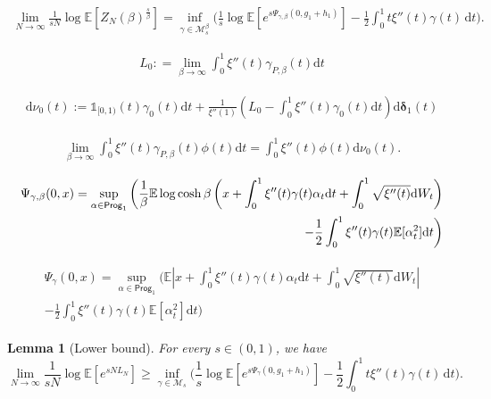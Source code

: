 \documentclass[10pt,a4paper]{amsart}
\newtheorem{lemma}{Lemma}
\newcommand{\E}{\mathbb{E}}
\newcommand{\Ll}{\left}
\newcommand{\Rr}{\right}
\newcommand{\cM}{\mathcal{M}}
\renewcommand{\d}{\mathrm{d}}
\renewcommand{\geq}{\geqslant}
\newcommand{\prog}{\mathsf{Prog}}
\begin{document}
\begin{align}\label{e.lim1/sNlogE[Z_N(beta)^s/beta]}
    \lim_{N\to\infty}\frac{1}{sN}\log \E\Ll[Z_N(\beta)^\frac{s}{\beta}\Rr] = \inf_{\gamma \in \cM_s^\beta}\bigg( \frac{1}{s}\log\E\Ll[e^{s\Psi_{\gamma,\beta}(0,g_1+h_1)}\Rr] - \frac{1}{2} \int_0^1 t \xi''(t) \gamma(t) \, \d t \bigg).
\end{align}

\begin{align}\label{e.L_0=}
    L_0 : = \lim_{\beta\to\infty}\int_0^1\xi''(t)\gamma_{P,\beta}(t)\d t
\end{align}

\begin{align}\label{e.nu_0=}
    \d \nu_0(t):=\mathds{1}_{[0,1)}(t)\gamma_0(t)\d t + \frac{1}{\xi''(1)}\Ll(L_0 - \int_0^1\xi''(t)\gamma_0(t)\d t\Rr)\d\boldsymbol{\delta}_1( t)
\end{align}

\begin{align}\label{e.int..phi->int..phidnu}
    \lim_{\beta\to\infty}\int_0^1\xi''(t)\gamma_{P,\beta}(t)\phi(t)\d t= \int_0^1\xi''(t)\phi(t)\d \nu_0(t).
\end{align}

\begin{align}
    \Psi_{\gamma,\beta}(0,x) = \sup_{\alpha\in\prog_1}\bigg(\frac{1}{\beta}\E\log\cosh \beta\Ll( x + \int_0^1\xi''(t)\gamma(t)\alpha_t\d t +\int_0^1\sqrt{\xi''(t)}\d W_t\Rr)\notag
    \\
    -\frac{1}{2}\int_0^1 \xi''(t)\gamma(t)\E[\alpha^2_t]\d t\bigg) \label{e.AC_rep_1}
\end{align}

\begin{align}\label{e.AC_rep_2}
\begin{split}
    \Psi_{\gamma}(0,x) = \sup_{\alpha\in\prog_1}\bigg(\E\Ll| x + \int_0^1\xi''(t)\gamma(t)\alpha_t\d t +\int_0^1\sqrt{\xi''(t)}\d W_t\Rr|
    \\
    -\frac{1}{2}\int_0^1 \xi''(t)\gamma(t)\E[\alpha^2_t]\d t\bigg)
\end{split}
\end{align}

\begin{lemma}[Lower bound]\label{l.laplace_>}
For every $s \in (0,1)$, we have
\begin{equation}
\label{e.laplace_>}
\lim_{N\to \infty} \frac{1}{sN} \log \E \Ll[ e^{sN L_N} \Rr]   \geq  \inf_{\gamma \in \cM_{s }}\bigg( \frac 1 s \log \E\Ll[e^{s\Psi_{\gamma}(0,g_1+h_1)}\Rr] - \frac{1}{2} \int_0^1 t \xi''(t) \gamma(t) \, \d t \bigg).
\end{equation}
\end{lemma}
\end{document}

